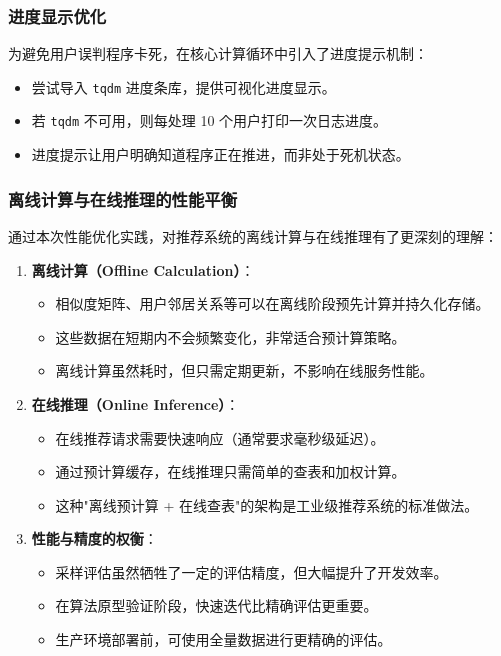 \documentclass[a4paper]{article}
\begin{document}
\subsubsection{进度显示优化}

为避免用户误判程序卡死，在核心计算循环中引入了进度提示机制：

\begin{itemize}
    \item 尝试导入 \texttt{tqdm} 进度条库，提供可视化进度显示。
    \item 若 \texttt{tqdm} 不可用，则每处理 10 个用户打印一次日志进度。
    \item 进度提示让用户明确知道程序正在推进，而非处于死机状态。
\end{itemize}

\subsubsection{离线计算与在线推理的性能平衡}

通过本次性能优化实践，对推荐系统的离线计算与在线推理有了更深刻的理解：

\begin{enumerate}
    \item \textbf{离线计算（Offline Calculation）}：
    \begin{itemize}
        \item 相似度矩阵、用户邻居关系等可以在离线阶段预先计算并持久化存储。
        \item 这些数据在短期内不会频繁变化，非常适合预计算策略。
        \item 离线计算虽然耗时，但只需定期更新，不影响在线服务性能。
    \end{itemize}
    
    \item \textbf{在线推理（Online Inference）}：
    \begin{itemize}
        \item 在线推荐请求需要快速响应（通常要求毫秒级延迟）。
        \item 通过预计算缓存，在线推理只需简单的查表和加权计算。
        \item 这种"离线预计算 + 在线查表"的架构是工业级推荐系统的标准做法。
    \end{itemize}
    
    \item \textbf{性能与精度的权衡}：
    \begin{itemize}
        \item 采样评估虽然牺牲了一定的评估精度，但大幅提升了开发效率。
        \item 在算法原型验证阶段，快速迭代比精确评估更重要。
        \item 生产环境部署前，可使用全量数据进行更精确的评估。
    \end{itemize}
\end{enumerate}
\end{document}
